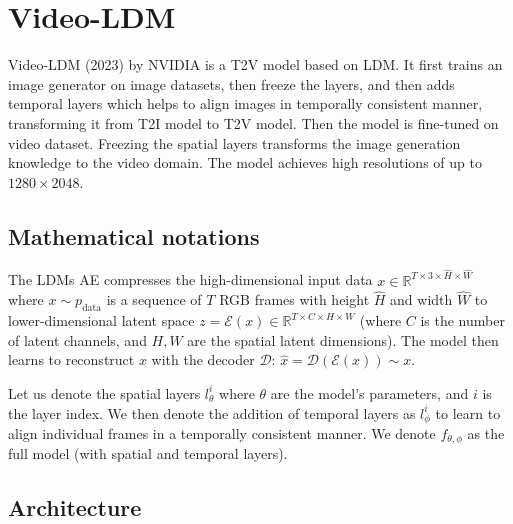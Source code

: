 \section{Video-LDM}
\label{sec:videoldm}

Video-LDM (2023) by NVIDIA \cite{video_ldm} is a T2V model based on LDM. It first trains an image generator on image datasets, then freeze the layers, and then adds temporal layers which helps to align images in temporally consistent manner, transforming it from T2I model to T2V model. Then the model is fine-tuned on video dataset. Freezing the spatial layers transforms the image generation knowledge to the video domain. The model achieves high resolutions of up to $1280\times 2048$.


\subsection*{Mathematical notations}

The LDMs AE compresses the high-dimensional input data $x \in \mathbb{R}^{T \times 3 \times \hat{H} \times \hat{W}}$ where $x \sim p_{\text{data}}$ is a sequence of $T$ RGB frames with height $\hat{H}$ and width $\hat{W}$ to lower-dimensional latent space $z = \mathcal{E} (x) \in \mathbb{R}^{T \times C \times H \times W}$ (where $C$ is the number of latent channels, and $H, W$ are the spatial latent dimensions). The model then learns to reconstruct $x$ with the decoder $\mathcal{D}$: $\hat{x} = \mathcal{D} (\mathcal{E} (x)) \sim x$.

Let us denote the spatial layers $l^i_{\theta}$ where $\theta$ are the model's parameters, and $i$ is the layer index. We then denote the addition of temporal layers as $l^i_{\phi}$ to learn to align individual frames in a temporally consistent manner. We denote $f_{\theta, \phi}$ as the full model (with spatial and temporal layers).








\subsection{Architecture}

